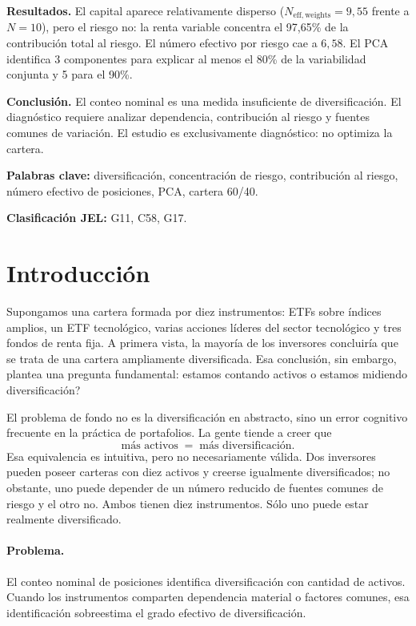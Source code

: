 \documentclass[12pt,letterpaper]{article}
\begin{document}
\noindent\textbf{Resultados.}
El capital aparece relativamente disperso (\(N_{\mathrm{eff,weights}}=9{,}55\) frente a \(N=10\)), pero el riesgo no: la renta variable concentra el 97{,}65\% de la contribución total al riesgo. El número efectivo por riesgo cae a \(6{,}58\). El PCA identifica 3 componentes para explicar al menos el 80\% de la variabilidad conjunta y 5 para el 90\%.

\noindent\textbf{Conclusión.}
El conteo nominal es una medida insuficiente de diversificación. El diagnóstico requiere analizar dependencia, contribución al riesgo y fuentes comunes de variación. El estudio es exclusivamente diagnóstico: no optimiza la cartera.

\vspace{1.0em}
\noindent\textbf{Palabras clave:}
diversificación, concentración de riesgo, contribución al riesgo, número efectivo de posiciones, PCA, cartera 60/40.

\vspace{0.5em}
\noindent\textbf{Clasificación JEL:}
G11, C58, G17.

\newpage

\section{Introducción}

Supongamos una cartera formada por diez instrumentos: ETFs sobre índices amplios, un ETF tecnológico, varias acciones líderes del sector tecnológico y tres fondos de renta fija. A primera vista, la mayoría de los inversores concluiría que se trata de una cartera ampliamente diversificada. Esa conclusión, sin embargo, plantea una pregunta fundamental: \textquestiondown{}estamos contando activos o estamos midiendo diversificación?

El problema de fondo no es la diversificación en abstracto, sino un error cognitivo frecuente en la práctica de portafolios. La gente tiende a creer que
\[
\text{más activos} \;=\; \text{más diversificación}.
\]
Esa equivalencia es intuitiva, pero no necesariamente válida. Dos inversores pueden poseer carteras con diez activos y creerse igualmente diversificados; no obstante, uno puede depender de un número reducido de fuentes comunes de riesgo y el otro no. Ambos tienen diez instrumentos. Sólo uno puede estar realmente diversificado.

\paragraph{Problema.}
El conteo nominal de posiciones identifica diversificación con cantidad de activos. Cuando los instrumentos comparten dependencia material o factores comunes, esa identificación sobreestima el grado efectivo de diversificación.
\end{document}
